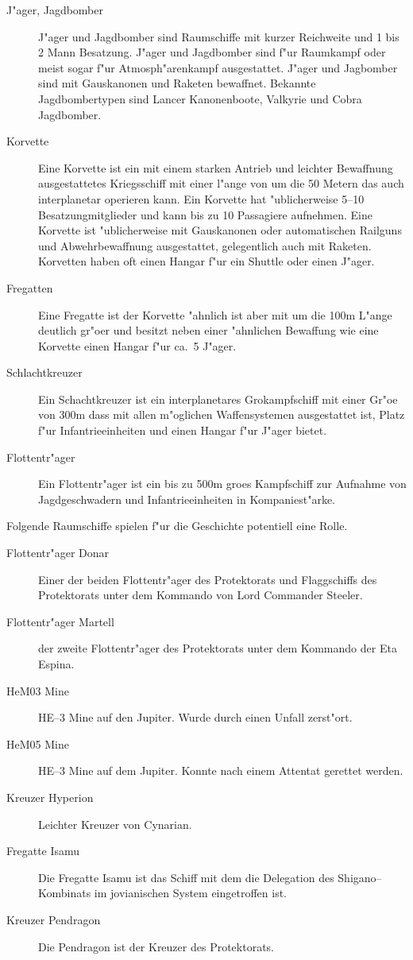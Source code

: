 \begin{appendices}
\begin{description}
\item [J"ager, Jagdbomber] J"ager und Jagdbomber sind Raumschiffe mit kurzer Reichweite und 1 bis 2 Mann Besatzung.
      J"ager und Jagdbomber sind f"ur Raumkampf oder meist sogar f"ur Atmosph"arenkampf ausgestattet. J"ager und Jagbomber sind mit Gauskanonen und Raketen bewaffnet. Bekannte Jagdbombertypen sind Lancer Kanonenboote, Valkyrie  und Cobra Jagdbomber.
\item [Korvette] Eine Korvette ist ein mit einem starken Antrieb und leichter Bewaffnung ausgestattetes Kriegsschiff
      mit einer l"ange von um die 50 Metern das auch interplanetar operieren kann. Ein Korvette hat "ublicherweise 5--10 Besatzungmitglieder und kann bis zu 10 Passagiere aufnehmen. Eine Korvette ist "ublicherweise mit Gauskanonen oder automatischen Railguns und Abwehrbewaffnung ausgestattet, gelegentlich auch mit Raketen. Korvetten haben oft einen Hangar f"ur ein Shuttle oder einen J"ager.
\item [Fregatten] Eine Fregatte ist der Korvette "ahnlich ist aber mit um die 100m L"ange deutlich gr"o\3er und besitzt
      neben einer "ahnlichen Bewaffung wie eine Korvette einen Hangar f"ur ca.~5 J"ager.
\item [Schlachtkreuzer] Ein Schachtkreuzer ist ein interplanetares Gro\3kampfschiff mit einer Gr"o\3e von 300m dass mit allen m"oglichen Waffensystemen ausgestattet ist, Platz f"ur Infantrieeinheiten und einen Hangar f"ur J"ager bietet.
\item [Flottentr"ager] Ein Flottentr"ager ist ein bis zu 500m gro\3es Kampfschiff zur Aufnahme von
      Jagdgeschwadern und Infantrieeinheiten in Kompaniest"arke.
\end{description}

Folgende Raumschiffe spielen f"ur die Geschichte potentiell eine Rolle.

\begin{description}
\item [Flottentr"ager Donar] Einer der beiden Flottentr"ager des Protektorats und Flaggschiffs des Protektorats unter
       dem Kommando von Lord Commander Steeler.
\item [Flottentr"ager Martell] der zweite Flottentr"ager des Protektorats unter dem Kommando der Eta Espina.
\item [HeM03 Mine] HE--3 Mine auf den Jupiter. Wurde durch einen Unfall zerst"ort.
\item [HeM05 Mine] HE--3 Mine auf dem Jupiter. Konnte nach einem Attentat gerettet werden.
\item [Kreuzer Hyperion] Leichter Kreuzer von Cynarian.
\item [Fregatte Isamu] Die Fregatte Isamu ist das Schiff mit dem die Delegation des Shigano--Kombinats im jovianischen
      System eingetroffen ist.
\item [Kreuzer Pendragon] Die Pendragon ist der Kreuzer des Protektorats.
\end{description}


\end{appendices}
